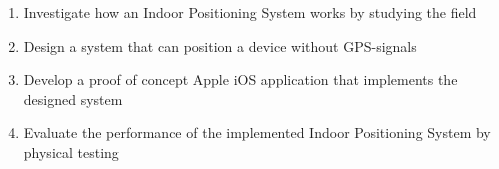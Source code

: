 	\begin{enumerate}
		\item
		Investigate how an Indoor Positioning System works by studying the field

		\item
		Design a system that can position a device without GPS-signals

		\item
		Develop a proof of concept Apple iOS application that implements the designed system

		\item
		Evaluate the performance of the implemented Indoor Positioning System by physical testing
	\end{enumerate}
